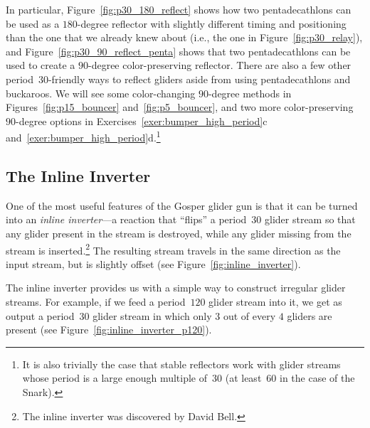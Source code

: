 In particular, Figure~\ref{fig:p30_180_reflect} shows how two pentadecathlons can be used as a $180$-degree reflector with slightly different timing and positioning than the one that we already knew about (i.e., the one in Figure~\ref{fig:p30_relay}), and Figure~\ref{fig:p30_90_reflect_penta} shows that two pentadecathlons can be used to create a $90$-degree color-preserving reflector. There are also a few other period~$30$-friendly ways to reflect gliders aside from using pentadecathlons and buckaroos. We will see some color-changing $90$-degree methods in Figures~\ref{fig:p15_bouncer} and~\ref{fig:p5_bouncer}, and two more color-preserving $90$-degree options in Exercises~\ref{exer:bumper_high_period}c and~\ref{exer:bumper_high_period}d.\footnote{It is also trivially the case that stable reflectors work with glider streams whose period is a large enough multiple of~$30$ (at least~$60$ in the case of the Snark).} 


\subsection{The Inline Inverter}\label{sec:p30_inline_inverter}

One of the most useful features of the Gosper glider gun is that it can be turned into an \emph{inline inverter}---a reaction that ``flips'' a period~$30$ glider stream so that any glider present in the stream is destroyed, while any glider missing from the stream is inserted.\footnote{The inline inverter was discovered by David Bell.} The resulting stream travels in the same direction as the input stream, but is slightly offset (see Figure~\ref{fig:inline_inverter}).

The inline inverter provides us with a simple way to construct irregular glider streams. For example, if we feed a period~$120$ glider stream into it, we get as output a period~$30$ glider stream in which only $3$ out of every $4$ gliders are present (see Figure~\ref{fig:inline_inverter_p120}).

